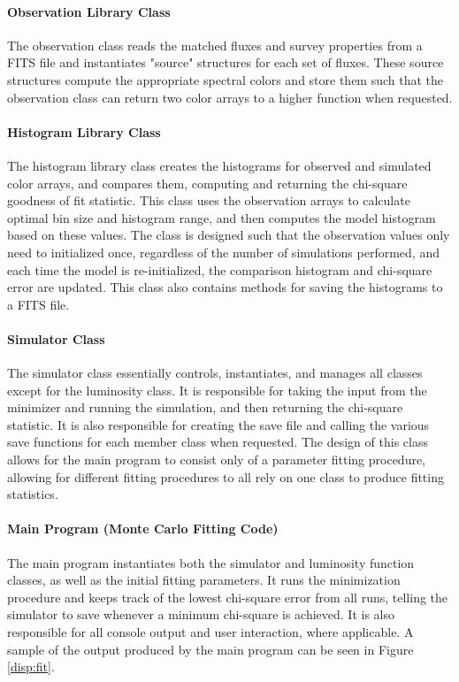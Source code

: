 \documentclass[twocolumn,letterpaper,10pt]{article}
\begin{document}
\paragraph{Observation Library Class}
The observation class reads the matched fluxes and survey properties from a FITS file and instantiates "source" structures for each set of fluxes. These source structures compute the appropriate spectral colors and store them such that the observation class can return two color arrays to a higher function when requested.

\paragraph{Histogram Library Class}
The histogram library class creates the histograms for observed and simulated color arrays, and compares them, computing and returning the chi-square goodness of fit statistic. This class uses the observation arrays to calculate optimal bin size and histogram range, and then computes the model histogram based on these values. The class is designed such that the observation values only need to initialized once, regardless of the number of simulations performed, and each time the model is re-initialized, the comparison histogram and chi-square error are updated. This class also contains methods for saving the histograms to a FITS file.

\paragraph{Simulator Class}
The simulator class essentially controls, instantiates, and manages all classes except for the luminosity class. It is responsible for taking the input from the minimizer and running the simulation, and then returning the chi-square statistic. It is also responsible for creating the save file and calling the various save functions for each member class when requested. The design of this class allows for the main program to consist only of a parameter fitting procedure, allowing for different fitting procedures to all rely on one class to produce fitting statistics.

\paragraph{Main Program (Monte Carlo Fitting Code)}

The main program instantiates both the simulator and luminosity function classes, as well as the initial fitting parameters. It runs the minimization procedure and keeps track of the lowest chi-square error from all runs, telling the simulator to save whenever a minimum chi-square is achieved. It is also responsible for all console output and user interaction, where applicable. A sample of the output produced by the main program can be seen in Figure \ref{disp:fit}.
\end{document}
